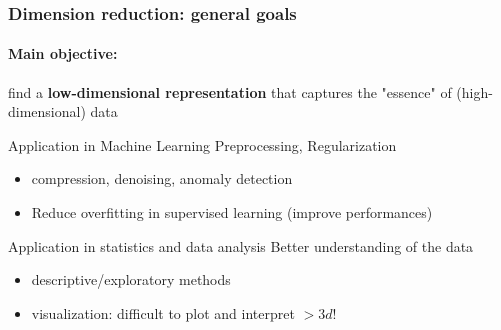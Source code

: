 \documentclass{beamer}\usepackage[]{graphicx}\usepackage[]{color}
\begin{document}
\begin{frame}[label=DimensionReduction]
  \frametitle{Dimension reduction: general goals}

  \paragraph{Main objective:} find a \alert{\bf low-dimensional representation} that captures the "essence" of (high-dimensional) data

  \vfill

  \begin{block}{Application in Machine Learning}
  Preprocessing, Regularization
  \begin{itemize}
    \item compression, denoising,  anomaly detection
    \item Reduce overfitting in supervised learning (improve performances)
  \end{itemize}
  \end{block}

\vfill

  \begin{block}{Application in statistics and data analysis}
    Better understanding of the data 
    \begin{itemize}
      \item descriptive/exploratory methods
      \item visualization: difficult to plot and interpret $> 3d$!
    \end{itemize}
  \end{block}

\end{frame}
\end{document}
